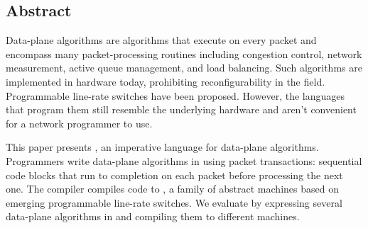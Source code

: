 \subsection*{Abstract}
Data-plane algorithms are algorithms that execute on every packet and encompass
many packet-processing routines including congestion control, network
measurement, active queue management, and load balancing. Such algorithms are
implemented in hardware today, prohibiting reconfigurability in the field.
Programmable line-rate switches have been proposed. However, the languages that
program them still resemble the underlying hardware and aren't convenient for a
network programmer to use.

This paper presents \pktlanguage, an imperative language for data-plane
algorithms. Programmers write data-plane algorithms in \pktlanguage using
packet transactions: sequential code blocks that run to completion on each
packet before processing the next one. The \pktlanguage compiler compiles
\pktlanguage code to \absmachine, a family of abstract machines based on
emerging programmable line-rate switches.  We evaluate \pktlanguage by
expressing several data-plane algorithms in \pktlanguage and compiling them to
different \absmachine machines.
